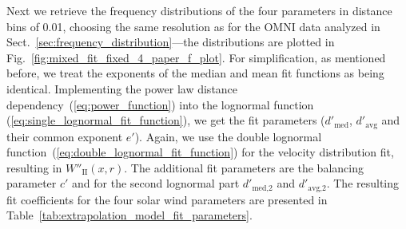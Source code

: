 Next we retrieve the frequency distributions of the four parameters in distance bins of \SI{0.01}{\au},  choosing the same resolution as for the OMNI data analyzed in Sect.~\ref{sec:frequency_distribution}---the distributions are plotted in Fig.~\ref{fig:mixed_fit_fixed_4_paper_f_plot}.
For simplification, as mentioned before, we treat the exponents of the median and mean fit functions as being identical. Implementing the power law distance dependency~(\ref{eq:power_function}) into the lognormal function (\ref{eq:single_lognormal_fit_function}), we get the fit parameters ($d'_\text{med}$, $d'_\text{avg}$ and their common exponent $e'$). Again, we use the double lognormal function~(\ref{eq:double_lognormal_fit_function}) for the velocity distribution fit, resulting in $W''_\text{II}(x,r)$. The additional fit parameters are the balancing parameter $c'$ and for the second lognormal part $d'_\text{med,2}$ and $d'_\text{avg,2}$. The resulting fit coefficients for the four solar wind parameters are presented in Table~\ref{tab:extrapolation_model_fit_parameters}.
